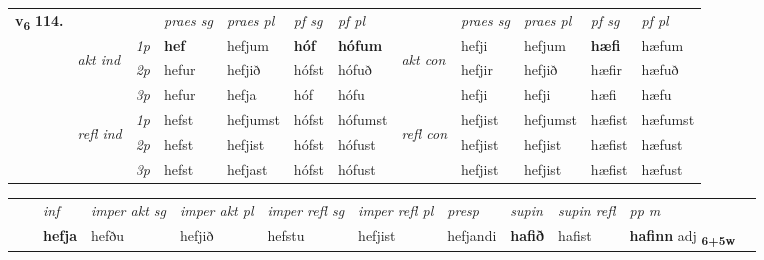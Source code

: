\begin{tabular}{llllllllllll} \toprule
\multirow{4}{*}{{{\textbf{v{\textsubscript{6}}} \Large{\textbf{114.}}}}}  & &   &  \textit{praes sg}  & \textit{praes pl}  &\textit{ pf sg} & \textit{pf pl} &  &  \textit{praes sg}  & \textit{praes pl}  & \textit{pf sg} & \textit{pf pl } \\*
	\cmidrule{4-7} \cmidrule{9-12}
 & \multirow{3}{*}{\begin{turn}{90}\textit{akt ind}\end{turn}} & {\textit{1p}} & \textbf{hef} & hefjum    & \textbf{hóf} & \textbf{hófum} & \multirow{3}{*}{\begin{turn}{90}\textit{akt con}\end{turn}} &hefji & hefjum & \textbf{hæfi} & hæfum\\*
& &  {\textit{2p}} &  hefur  & hefjið   & hófst & hófuð & & hefjir & hefjið & hæfir & hæfuð \\*
& &  {\textit{3p}} & hefur & hefja   & hóf & hófu & & hefji & hefji& hæfi & hæfu  \\*
\cmidrule{4-7} \cmidrule{9-12}
 &\multirow{3}{*}{\begin{turn}{90}\textit{refl ind}\end{turn}} & {\textit{1p}} & hefst & hefjumst    & hófst & hófumst & \multirow{3}{*}{\begin{turn}{90}\textit{refl con}\end{turn}}  &hefjist & hefjumst & hæfist & hæfumst\\*
 &&  {\textit{2p}} &  hefst  & hefjist   & hófst & hófust & &hefjist & hefjist & hæfist & hæfust \\*
& &  {\textit{3p}} & hefst & hefjast   & hófst & hófust & & hefjist & hefjist& hæfist & hæfust  \\*
\cmidrule{4-7} \cmidrule{9-12}
\end{tabular}


\begin{tabular}{llllllllllll}
 & & \textit{inf} & \textit{imper akt sg} & \textit{imper akt pl} & \textit{imper refl sg} & \textit{imper refl pl} & \textit{presp} & \textit{supin} & \textit{supin refl} & \textit{pp m}     \\*
  & & \textbf{hefja} & hefðu  & hefjið & hefstu & hefjist & hefjandi &  \textbf{hafið} & hafist & \textbf{hafinn} adj \textbf{\textsubscript{6+5w}} \\*
\cmidrule{1-12}
\end{tabular}





